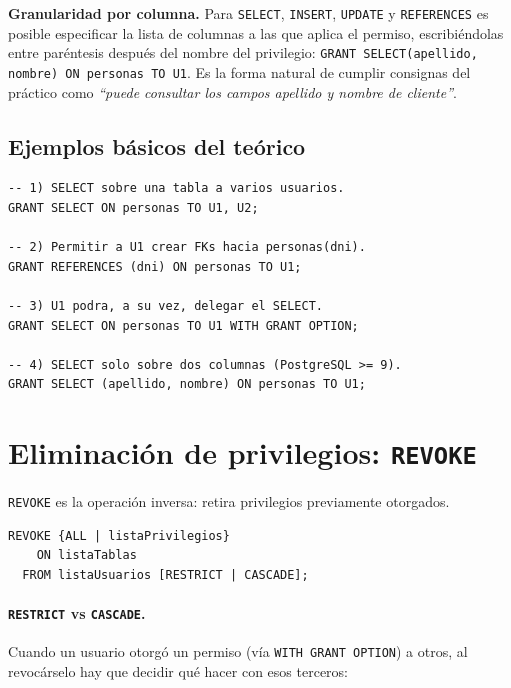 \documentclass[11pt,a4paper]{article}
\begin{document}
\begin{nota}
\textbf{Granularidad por columna.} Para \texttt{SELECT}, \texttt{INSERT},
\texttt{UPDATE} y \texttt{REFERENCES} es posible especificar la lista
de columnas a las que aplica el permiso, escribiéndolas entre paréntesis
después del nombre del privilegio: \texttt{GRANT SELECT(apellido,
nombre) ON personas TO U1}. Es la forma natural de cumplir consignas
del práctico como \emph{``puede consultar los campos apellido y nombre
de cliente''}.
\end{nota}

\subsection{Ejemplos básicos del teórico}

\begin{lstlisting}
-- 1) SELECT sobre una tabla a varios usuarios.
GRANT SELECT ON personas TO U1, U2;

-- 2) Permitir a U1 crear FKs hacia personas(dni).
GRANT REFERENCES (dni) ON personas TO U1;

-- 3) U1 podra, a su vez, delegar el SELECT.
GRANT SELECT ON personas TO U1 WITH GRANT OPTION;

-- 4) SELECT solo sobre dos columnas (PostgreSQL >= 9).
GRANT SELECT (apellido, nombre) ON personas TO U1;
\end{lstlisting}

\section{Eliminación de privilegios: \texttt{REVOKE}}

\texttt{REVOKE} es la operación inversa: retira privilegios previamente
otorgados.

\begin{lstlisting}
REVOKE {ALL | listaPrivilegios}
    ON listaTablas
  FROM listaUsuarios [RESTRICT | CASCADE];
\end{lstlisting}

\paragraph{\texttt{RESTRICT} vs \texttt{CASCADE}.} Cuando un usuario
otorgó un permiso (vía \texttt{WITH GRANT OPTION}) a otros, al revocárselo
hay que decidir qué hacer con esos terceros:
\end{document}
